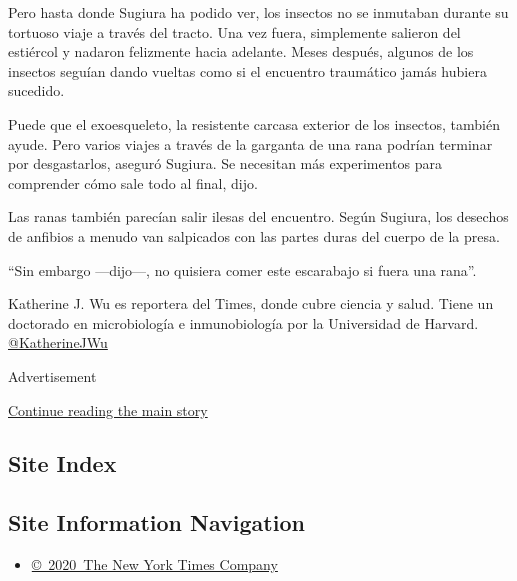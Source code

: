 Pero hasta donde Sugiura ha podido ver, los insectos no se inmutaban
durante su tortuoso viaje a través del tracto. Una vez fuera,
simplemente salieron del estiércol y nadaron felizmente hacia adelante.
Meses después, algunos de los insectos seguían dando vueltas como si el
encuentro traumático jamás hubiera sucedido.

Puede que el exoesqueleto, la resistente carcasa exterior de los
insectos, también ayude. Pero varios viajes a través de la garganta de
una rana podrían terminar por desgastarlos, aseguró Sugiura. Se
necesitan más experimentos para comprender cómo sale todo al final,
dijo.

Las ranas también parecían salir ilesas del encuentro. Según Sugiura,
los desechos de anfibios a menudo van salpicados con las partes duras
del cuerpo de la presa.

``Sin embargo ---dijo---, no quisiera comer este escarabajo si fuera una
rana''.

Katherine J. Wu es reportera del Times, donde cubre ciencia y salud.
Tiene un doctorado en microbiología e inmunobiología por la Universidad
de Harvard. \href{https://twitter.com/KatherineJWu}{@KatherineJWu}

Advertisement

\protect\hyperlink{after-bottom}{Continue reading the main story}

\hypertarget{site-index}{%
\subsection{Site Index}\label{site-index}}

\hypertarget{site-information-navigation}{%
\subsection{Site Information
Navigation}\label{site-information-navigation}}

\begin{itemize}
\tightlist
\item
  \href{https://help.nytimes3xbfgragh.onion/hc/en-us/articles/115014792127-Copyright-notice}{©~2020~The
  New York Times Company}
\end{itemize}


